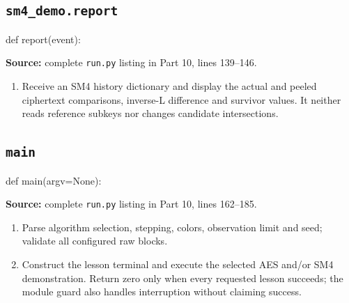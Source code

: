\subsection{\texttt{sm4\_\allowbreak{}demo.report}}
\begin{lightcode}
def report(event):
\end{lightcode}
\noindent\textbf{Source:} complete \texttt{run.py} listing in Part 10, lines 139--146.
\begin{enumerate}
\item Receive an SM4 history dictionary and display the actual and peeled ciphertext comparisons, inverse-L difference and survivor values. It neither reads reference subkeys nor changes candidate intersections.
\end{enumerate}
\subsection{\texttt{main}}
\begin{lightcode}
def main(argv=None):
\end{lightcode}
\noindent\textbf{Source:} complete \texttt{run.py} listing in Part 10, lines 162--185.
\begin{enumerate}
\item Parse algorithm selection, stepping, colors, observation limit and seed; validate all configured raw blocks.
\item Construct the lesson terminal and execute the selected AES and/or SM4 demonstration. Return zero only when every requested lesson succeeds; the module guard also handles interruption without claiming success.
\end{enumerate}
